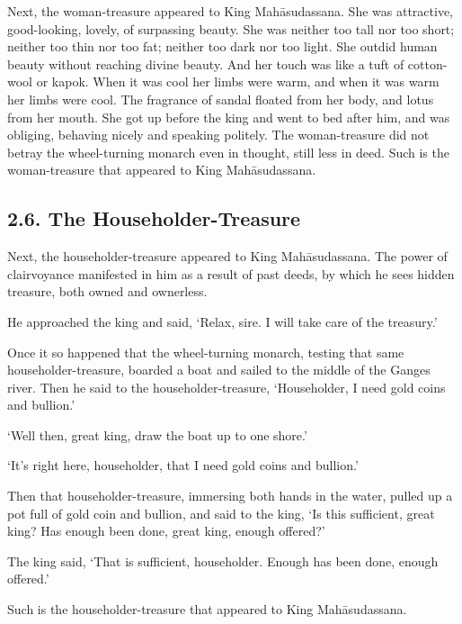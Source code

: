 \documentclass[12pt,openany]{book}%
\begin{document}
Next, the woman-treasure appeared to King \textsanskrit{Mahāsudassana}. She was attractive, good-looking, lovely, of surpassing beauty. She was neither too tall nor too short; neither too thin nor too fat; neither too dark nor too light. She outdid human beauty without reaching divine beauty. And her touch was like a tuft of cotton-wool or kapok. When it was cool her limbs were warm, and when it was warm her limbs were cool. The fragrance of sandal floated from her body, and lotus from her mouth. She got up before the king and went to bed after him, and was obliging, behaving nicely and speaking politely. The woman-treasure did not betray the wheel-turning monarch even in thought, still less in deed. Such is the woman-treasure that appeared to King \textsanskrit{Mahāsudassana}. 

\subsection*{2.6. The Householder-Treasure }

Next, the householder-treasure appeared to King \textsanskrit{Mahāsudassana}. The power of clairvoyance manifested in him as a result of past deeds, by which he sees hidden treasure, both owned and ownerless. 

He approached the king and said, ‘Relax, sire. I will take care of the treasury.’ 

Once it so happened that the wheel-turning monarch, testing that same householder-treasure, boarded a boat and sailed to the middle of the Ganges river. Then he said to the householder-treasure, ‘Householder, I need gold coins and bullion.’ 

‘Well then, great king, draw the boat up to one shore.’ 

‘It’s right here, householder, that I need gold coins and bullion.’ 

Then that householder-treasure, immersing both hands in the water, pulled up a pot full of gold coin and bullion, and said to the king, ‘Is this sufficient, great king? Has enough been done, great king, enough offered?’ 

The king said, ‘That is sufficient, householder. Enough has been done, enough offered.’ 

Such is the householder-treasure that appeared to King \textsanskrit{Mahāsudassana}. 
\end{document}
